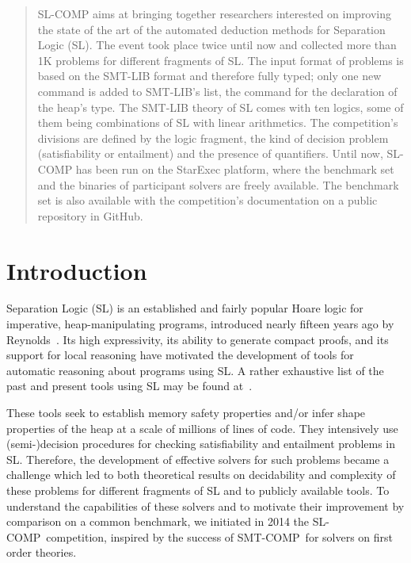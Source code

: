 \documentclass[orivec]{llncs}
\newcommand{\smtlib}{\textsf{SMT-LIB}}
\newcommand{\smtcomp}{\textsf{SMT-COMP}}
\newcommand{\slcomp}{\textsf{SL-COMP}}
\begin{document}
\date{\today}
\maketitle
\sloppy


\begin{abstract}
SL-COMP aims at bringing together researchers interested on improving
the state of the art of the automated deduction methods for Separation Logic (SL).
The event took place twice until now and collected more than 1K
 problems for different fragments of SL.
The input format of problems is based on the SMT-LIB format
and therefore fully typed; only one new command is added to SMT-LIB's
list, the command for the declaration of the heap's type.
The SMT-LIB theory of SL comes with ten logics, some of them
being combinations of SL with linear arithmetics. The
competition's divisions are defined by the logic fragment,
the kind of decision problem (satisfiability or entailment) and
the presence of quantifiers.
Until now, SL-COMP has been run on the StarExec platform,
where the benchmark set and the binaries of participant solvers
are freely available. The benchmark set is also available
with the competition's documentation on a public repository in GitHub. 
\end{abstract}




\section{Introduction}

Separation Logic (SL) is an established and fairly popular Hoare logic 
for imperative, heap-manipulating programs, 
introduced nearly fifteen years ago by Reynolds~\cite{Reynolds99,OHearnRY01,Reynolds02}. 
%
Its high expressivity, its ability to generate compact proofs, and 
its support for local reasoning 
have motivated the development of tools for automatic reasoning about programs using SL.
A rather exhaustive list of the past and present tools using SL may be found at~\cite{OHearn-SLsite}.

These tools seek to establish memory safety properties and/or infer shape properties of the heap at a scale of millions of lines of code.
They intensively use (semi-)decision procedures for checking satisfiability and entailment problems in SL.
Therefore, the development of effective solvers for such problems became a challenge 
which led to both theoretical results on decidability and complexity of these problems 
for different fragments of SL and to publicly available tools. 
To understand the capabilities of these solvers and to motivate their improvement by 
comparison on a common benchmark, we initiated in 2014 the \slcomp\ competition,
inspired by the success of \smtcomp\ for solvers on first order theories.
\end{document}

